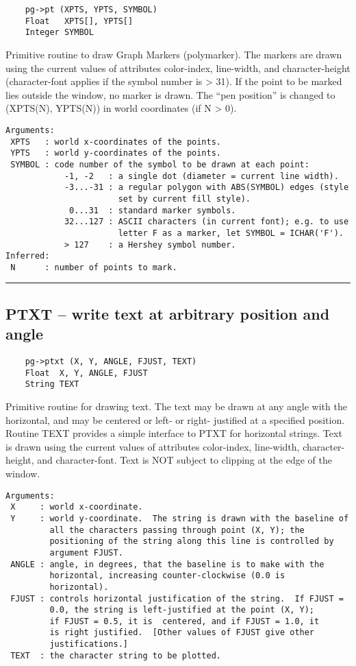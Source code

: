 \begin{verbatim}
    pg->pt (XPTS, YPTS, SYMBOL)
    Float   XPTS[], YPTS[]
    Integer SYMBOL
\end{verbatim}

Primitive routine to draw Graph Markers (polymarker).  The markers are
drawn using the current values of attributes color-index, line-width,
and character-height (character-font applies if the symbol number is >
31).  If the point to be marked lies outside the window, no marker is
drawn.  The ``pen position'' is changed to (XPTS(N), YPTS(N)) in world
coordinates (if N > 0).

\begin{verbatim}
Arguments:
 XPTS   : world x-coordinates of the points.
 YPTS   : world y-coordinates of the points.
 SYMBOL : code number of the symbol to be drawn at each point:
            -1, -2   : a single dot (diameter = current line width).
            -3...-31 : a regular polygon with ABS(SYMBOL) edges (style
                       set by current fill style). 
             0...31  : standard marker symbols.
            32...127 : ASCII characters (in current font); e.g. to use
                       letter F as a marker, let SYMBOL = ICHAR('F'). 
            > 127    : a Hershey symbol number.
Inferred:
 N      : number of points to mark.
\end{verbatim}

\hrule

\subsection*{PTXT -- write text at arbitrary position and angle }

\begin{verbatim}
    pg->ptxt (X, Y, ANGLE, FJUST, TEXT)
    Float  X, Y, ANGLE, FJUST
    String TEXT
\end{verbatim}

Primitive routine for drawing text.  The text may be drawn at any
angle with the horizontal, and may be centered or left- or right-
justified at a specified position.  Routine TEXT provides a simple
interface to PTXT for horizontal strings.  Text is drawn using the
current values of attributes color-index, line-width,
character-height, and character-font.  Text is NOT subject to clipping
at the edge of the window.

\begin{verbatim}
Arguments:
 X     : world x-coordinate.
 Y     : world y-coordinate.  The string is drawn with the baseline of
         all the characters passing through point (X, Y); the
         positioning of the string along this line is controlled by
         argument FJUST. 
 ANGLE : angle, in degrees, that the baseline is to make with the
         horizontal, increasing counter-clockwise (0.0 is
         horizontal). 
 FJUST : controls horizontal justification of the string.  If FJUST =
         0.0, the string is left-justified at the point (X, Y);
         if FJUST = 0.5, it is  centered, and if FJUST = 1.0, it
         is right justified.  [Other values of FJUST give other
         justifications.] 
 TEXT  : the character string to be plotted.
\end{verbatim}

